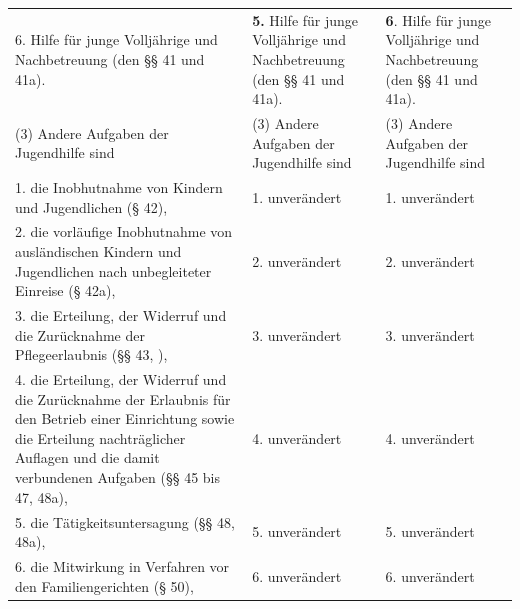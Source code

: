 \documentclass[10pt,a4paper,landscape]{article}
\begin{document}
\begin{longtable}{|L{8.2cm}|L{8.2cm}|L{8.2cm}|}
\hhline{|---|}
6.  \newline Hilfe für junge Volljährige und  \newline Nachbetreuung (den \S{}\S{} 41 und 41a). & \textbf{\textcolor{diffred}{5.}}  \newline Hilfe für junge Volljährige und  \newline Nachbetreuung (den \S{}\S{} 41 und 41a). & \textbf{\textcolor{diffgreen}{6}}\textcolor{diffgreen}{.}  \newline Hilfe für junge Volljährige und  \newline Nachbetreuung (den \S{}\S{} 41 und 41a). \\
\hhline{|---|}
(3) Andere Aufgaben der Jugendhilfe sind & (3) Andere Aufgaben der Jugendhilfe sind & (3) Andere Aufgaben der Jugendhilfe sind \\
\hhline{|---|}
1.   \newline die Inobhutnahme von Kindern und  \newline Jugendlichen (\S{} 42), & 1. unverändert & 1. unverändert \\
\hhline{|---|}
2.      \newline die vorläufige Inobhutnahme von  \newline ausländischen Kindern und Jugendlichen  \newline nach unbegleiteter Einreise (\S{} 42a), & 2.   unverändert & 2.   unverändert \\
\hhline{|---|}
3.  \newline die Erteilung, der Widerruf und die  \newline Zurücknahme der Pflegeerlaubnis (\S{}\S{} 43,  ), & 3.  unverändert & 3.  unverändert \\
\hhline{|---|}
4.  \newline die Erteilung, der Widerruf und die  \newline Zurücknahme der Erlaubnis für den Betrieb  \newline einer Einrichtung sowie die Erteilung  \newline nachträglicher Auflagen und die damit  \newline verbundenen Aufgaben (\S{}\S{} 45 bis 47, 48a), & 4. unverändert & 4. unverändert \\
\hhline{|---|}
5.  \newline die Tätigkeitsuntersagung (\S{}\S{} 48, 48a), & 5. unverändert & 5. unverändert \\
\hhline{|---|}
6.  \newline die Mitwirkung in Verfahren vor den  \newline Familiengerichten (\S{} 50), & 6. unverändert & 6. unverändert \\

\end{longtable}
\end{document}
